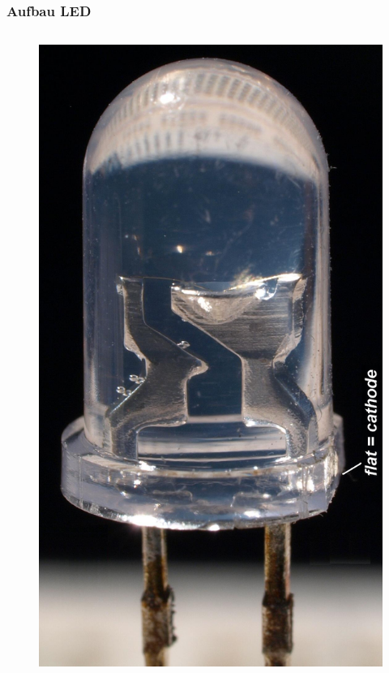\begin{frame}
  \frametitle{Aufbau LED}
  \begin{columns}[c]
    \column[c]{5cm}
    \begin{center}
      \begin{figure}
        \includegraphics[width=.9\textwidth,height=.75\textheight,keepaspectratio]{e12/Uvled_highres_macro.jpg}\\
      \end{figure}
    \end{center}

\end{columns}
\end{frame}
